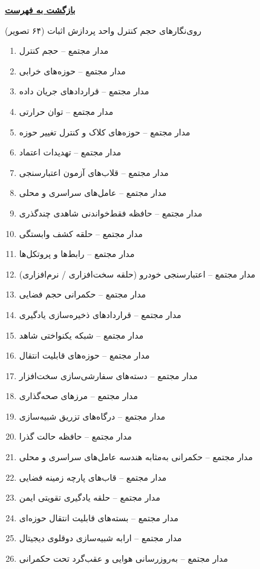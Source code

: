 \documentclass[10pt]{report}
\newcommand{\returnhome}{\vspace{0.5em}\noindent\protect\hyperlink{home}{\colorbox{conceptBox}{\color{headerColor}\textbf{بازگشت به فهرست}}}\par}
\begin{document}
\normalsize

\returnhome

\clearpage
\begin{announcementbox}{روی‌نگارهای حجم کنترل واحد پردازش اثبات (۶۴ تصویر)}
\small
\begin{enumerate}[leftmargin=*, label=\textcolor{primaryBlue}{\textbf{\arabic*.}}, itemsep=1pt, parsep=0pt]
  \item مدار مجتمع – حجم کنترل
  \item مدار مجتمع – حوزه‌های خرابی
  \item مدار مجتمع – قراردادهای جریان داده
  \item مدار مجتمع – توان حرارتی
  \item مدار مجتمع – حوزه‌های کلاک و کنترل تغییر حوزه
  \item مدار مجتمع – تهدیدات اعتماد
  \item مدار مجتمع – قلاب‌های آزمون اعتبارسنجی
  \item مدار مجتمع – عامل‌های سراسری و محلی
  \item مدار مجتمع – حافظه فقط‌خواندنی شاهدی چندگذری
  \item مدار مجتمع – حلقه کشف وابستگی
  \item مدار مجتمع – رابط‌ها و پروتکل‌ها
  \item مدار مجتمع – اعتبارسنجی خودرو (حلقه سخت‌افزاری / نرم‌افزاری)
  \item مدار مجتمع – حکمرانی حجم فضایی
  \item مدار مجتمع – قراردادهای ذخیره‌سازی یادگیری
  \item مدار مجتمع – شبکه یکنواختی شاهد
  \item مدار مجتمع – حوزه‌های قابلیت انتقال
  \item مدار مجتمع – دسته‌های سفارشی‌سازی سخت‌افزار
  \item مدار مجتمع – مرزهای صحه‌گذاری
  \item مدار مجتمع – درگاه‌های تزریق شبیه‌سازی
  \item مدار مجتمع – حافظه حالت گذرا
  \item مدار مجتمع – حکمرانی به‌مثابه هندسه عامل‌های سراسری و محلی
  \item مدار مجتمع – قاب‌های پارچه زمینه فضایی
  \item مدار مجتمع – حلقه یادگیری تقویتی ایمن
  \item مدار مجتمع – بسته‌های قابلیت انتقال حوزه‌ای
  \item مدار مجتمع – ارابه شبیه‌سازی دوقلوی دیجیتال
  \item مدار مجتمع – به‌روزرسانی هوایی و عقب‌گرد تحت حکمرانی

\end{enumerate}
\end{announcementbox}
\end{document}
